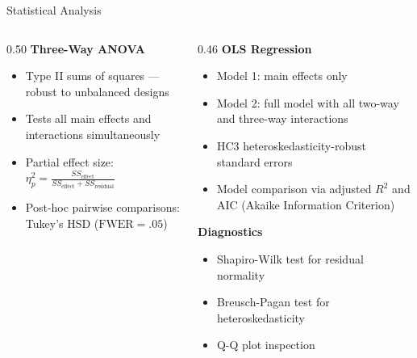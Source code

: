 \documentclass[aspectratio=169, 10pt]{beamer}
\begin{document}
\begin{frame}{Statistical Analysis}
  \begin{columns}[T]
    \begin{column}{0.50\textwidth}
      \textbf{Three-Way ANOVA}
      \vspace{0.4em}
      \begin{itemize}
        \setlength\itemsep{1em}
        \item Type II sums of squares — robust to unbalanced designs
        \item Tests all main effects and interactions simultaneously
        \item Partial effect size: \\[0.8em]
          $\displaystyle \eta^2_p = 
          \frac{SS_{\text{effect}}}{SS_{\text{effect}} + SS_{\text{residual}}}$
        \item Post-hoc pairwise comparisons: Tukey's HSD ($\text{FWER} = .05$)
      \end{itemize}
    \end{column}
    \begin{column}{0.46\textwidth}
      \textbf{OLS Regression}
      \vspace{0.4em}
      \begin{itemize}
        \setlength\itemsep{0.35em}
        \item Model 1: main effects only
        \item Model 2: full model with all two-way and three-way interactions
        \item HC3 heteroskedasticity-robust standard errors
        \item Model comparison via adjusted $R^2$ and AIC (Akaike Information Criterion)
      \end{itemize}
      \vspace{0.5em}
      \textbf{Diagnostics}
      \vspace{0.3em}
      \begin{itemize}
        \setlength\itemsep{0.35em}
        \item Shapiro-Wilk test for residual normality
        \item Breusch-Pagan test for heteroskedasticity
        \item Q-Q plot inspection
      \end{itemize}
    \end{column}
  \end{columns}
\end{frame}
\end{document}
